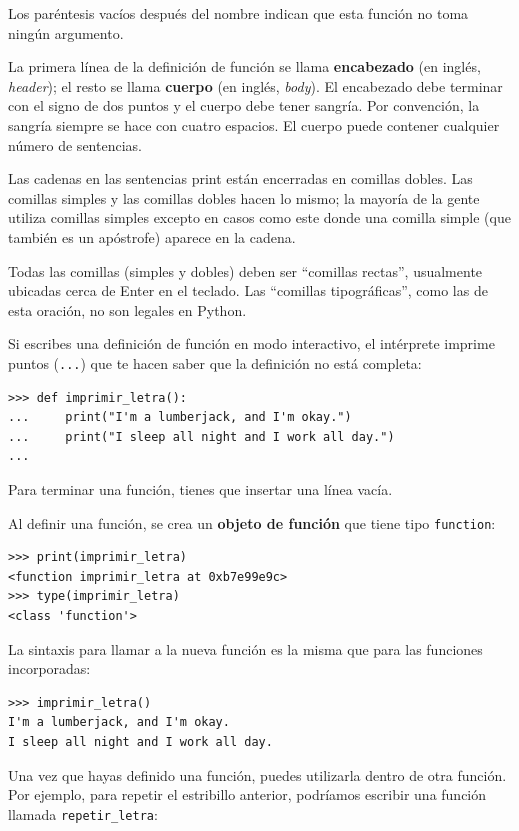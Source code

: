 \documentclass[10pt]{book}
\begin{document}
Los paréntesis vacíos después del nombre indican que esta función
no toma ningún argumento.

La primera línea de la definición de función se llama {\bf encabezado} (en inglés, {\em header});
el resto se llama {\bf cuerpo} (en inglés, {\em body}).  El encabezado debe terminar con el signo de dos puntos
y el cuerpo debe tener sangría.  Por convención, la sangría
siempre se hace con cuatro espacios.  El cuerpo puede contener
cualquier número de sentencias.

Las cadenas en las sentencias print están encerradas en comillas
dobles.  Las comillas simples y las comillas dobles hacen lo mismo;
la mayoría de la gente utiliza comillas simples excepto en casos como este donde
una comilla simple (que también es un apóstrofe) aparece en la cadena.

Todas las comillas (simples y dobles)
deben ser ``comillas rectas'', usualmente
ubicadas cerca de Enter en el teclado.  Las ``comillas tipográficas'', como
las de esta oración, no son legales en Python.

Si escribes una definición de función en modo interactivo, el intérprete
imprime puntos ({\tt ...}) que te hacen saber que la definición
no está completa:

\begin{verbatim}
>>> def imprimir_letra():
...     print("I'm a lumberjack, and I'm okay.")
...     print("I sleep all night and I work all day.")
...
\end{verbatim}
%
Para terminar una función, tienes que insertar una línea vacía.

Al definir una función, se crea un {\bf objeto de función} que tiene
tipo \verb"function":

\begin{verbatim}
>>> print(imprimir_letra)
<function imprimir_letra at 0xb7e99e9c>
>>> type(imprimir_letra)
<class 'function'>
\end{verbatim}
%
La sintaxis para llamar a la nueva función es la misma que
para las funciones incorporadas:

\begin{verbatim}
>>> imprimir_letra()
I'm a lumberjack, and I'm okay.
I sleep all night and I work all day.
\end{verbatim}
%
Una vez que hayas definido una función, puedes utilizarla dentro de otra
función.  Por ejemplo, para repetir el estribillo anterior, podríamos escribir
una función llamada \verb"repetir_letra":
\end{document}
